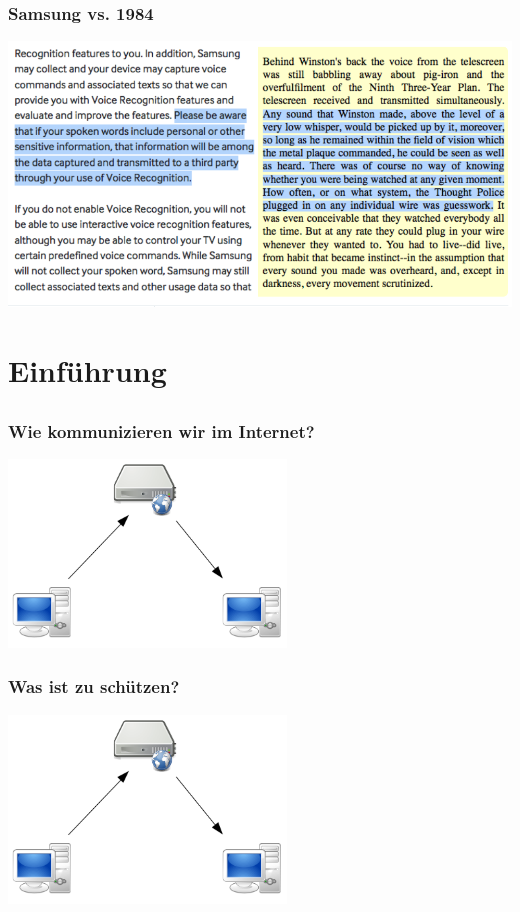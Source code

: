 \documentclass[12pt, xcolor={svgnames,table}]{beamer}
\begin{document}
\begin{frame}
    \frametitle{Samsung vs. 1984}
    \begin{center}
      \includegraphics[height=0.7\textheight]{img/samsung-1984.png}
    \end{center}
\end{frame}

\section{Einführung}
\subsection{}

\begin{frame}
    \frametitle{Wie kommunizieren wir im Internet?}
    \begin{center}
      \includegraphics[height=5cm]{img/c-s.png}
    \end{center}
\end{frame}

\begin{frame}
    \frametitle{Was ist zu schützen?}
    \begin{center}
      \includegraphics[height=5cm]{img/c-s.png}
    \end{center}
\end{frame}
\end{document}

